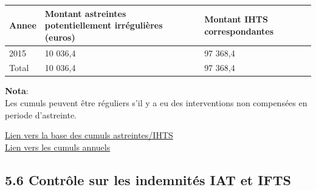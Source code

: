 \begin{longtable}[]{@{}lll@{}}
\toprule
\begin{minipage}[b]{0.07\columnwidth}\raggedright
Annee\strut
\end{minipage} & \begin{minipage}[b]{0.55\columnwidth}\raggedright
Montant astreintes potentiellement irrégulières (euros)\strut
\end{minipage} & \begin{minipage}[b]{0.29\columnwidth}\raggedright
Montant IHTS correspondantes\strut
\end{minipage}\tabularnewline
\midrule
\endhead
\begin{minipage}[t]{0.07\columnwidth}\raggedright
2015\strut
\end{minipage} & \begin{minipage}[t]{0.55\columnwidth}\raggedright
10 036,4\strut
\end{minipage} & \begin{minipage}[t]{0.29\columnwidth}\raggedright
97 368,4\strut
\end{minipage}\tabularnewline
\begin{minipage}[t]{0.07\columnwidth}\raggedright
Total\strut
\end{minipage} & \begin{minipage}[t]{0.55\columnwidth}\raggedright
10 036,4\strut
\end{minipage} & \begin{minipage}[t]{0.29\columnwidth}\raggedright
97 368,4\strut
\end{minipage}\tabularnewline
\bottomrule
\end{longtable}

\textbf{Nota}:\\
Les cumuls peuvent être réguliers s'il y a eu des interventions non
compensées en periode d'astreinte.

\href{../Bases/Reglementation/Controle_astreintes_HS_irreg.csv}{Lien vers
la base des cumuls astreintes/IHTS}\\
\href{../Bases/Reglementation/Cum_astreintes_HS_irreg.csv}{Lien vers les
cumuls annuels}

\hypertarget{controle-sur-les-indemnites-iat-et-ifts}{%
\subsection{5.6 Contrôle sur les indemnités IAT et
IFTS}\label{controle-sur-les-indemnites-iat-et-ifts}}

